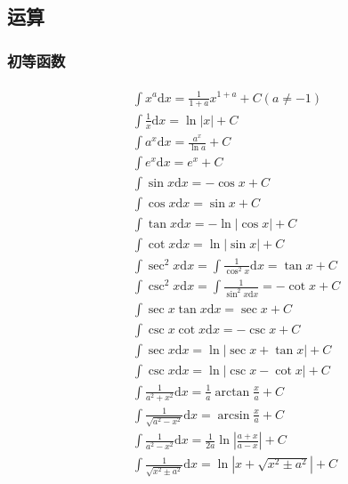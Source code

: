\documentclass[12pt]{book}
\begin{document}
\subsection{运算}

\clearpage
\subsubsection{初等函数}

\begin{gather*}
    \begin{aligned}
        & \int x^{a}\mathrm{d}x =\frac{1}{1+a}x^{1+a}+C (a\neq -1)  \\
        & \int{ \frac{1}{x} \mathrm{d}x} = \ln{|x|} +C \\
        & \int{a^{x}\mathrm{d}x} = \frac{a^x}{\ln{a}}+C \\
        & \int{e^x \mathrm{d}x} = e^x +C \\
        & \int{\sin{x}\mathrm{d}x} = -\cos{x}+C \\
        & \int{\cos{x}\mathrm{d}x} = \sin{x}+C \\
        & \int{\tan{x}\mathrm{d}x} = -\ln{|\cos{x}|}+C \\
        & \int{\cot{x}\mathrm{d}x} = \ln{|\sin{x}|}+C \\
        & \int{\sec^{2}{x}\mathrm{d}x} = \int{\frac{1}{\cos^2{x}}\mathrm{d}x} = \tan{x}+C \\
        & \int{\csc^2{x}\mathrm{d}x} = \int{\frac{1}{\sin^2{x}\mathrm{d}x}=-\cot{x}+C} \\
        & \int{\sec{x}\tan{x}\mathrm{d}x} = \sec{x}+C \\
        & \int{\csc{x}\cot{x}\mathrm{d}x} = -\csc{x}+C \\
        & \int{\sec{x}\mathrm{d}x} = \ln{|\sec{x}+\tan{x}|}+C\\
        & \int{\csc{x}\mathrm{d}x} = \ln{|\csc{x}-\cot{x}|}+C\\
        & \int{\frac{1}{a^2+x^2} \mathrm{d}x} = \frac{1}{a}\arctan{\frac{x}{a}}+C \\
        & \int{\frac{1}{\sqrt{a^2-x^2}}\mathrm{d}x} = \arcsin{\frac{x}{a}}+C \\
        & \int{\frac{1}{a^2-x^2}\mathrm{d}x} = \frac{1}{2a} \ln{\left|\frac{a+x}{a-x}\right|}+C \\
        & \int{\frac{1}{\sqrt{x^2\pm a^2}}\mathrm{d}x} = \ln{\left|x+ \sqrt{x^2\pm a^2}\right|}+C
        \end{aligned}
\end{gather*}
\end{document}
